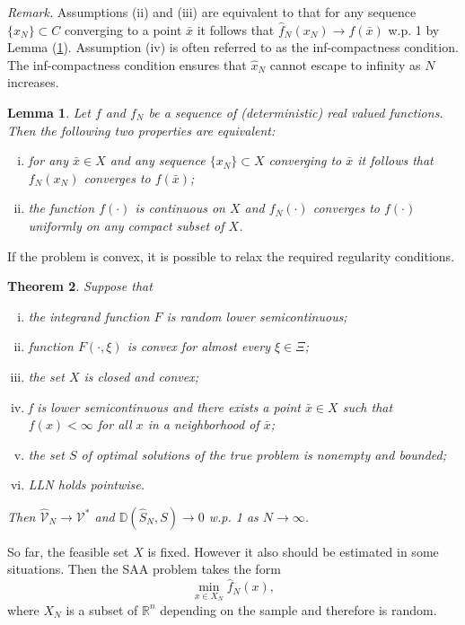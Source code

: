 \documentclass[a4pper,11pt]{article}
\newtheorem{thm}{Theorem}[section]
\newtheorem{lem}[thm]{Lemma}
\begin{document}
\textit{Remark.} Assumptions (ii) and (iii) are equivalent to that for any sequence $\{x_N\}\subset C$ converging to a point $\bar x$ it follows that $\hat f_N(x_N)\to f(\bar x)$ w.p. 1 by Lemma (\ref{5.1}). Assumption (iv) is often referred to as the inf-compactness condition. The inf-compactness condition ensures that $\hat x_N$ cannot escape to infinity as $N$ increases.
\begin{lem}
	Let $f$ and $f_N$ be a sequence of (deterministic) real valued functions. Then the following two properties are equivalent:
	\begin{enumerate}[(i)]
		\item for any $\bar x\in X$ and any sequence $\{x_N\}\subset X$ converging to $\bar x$ it follows that $f_N(x_N)$ converges to $f(\bar x)$;
		\item the function $f(\cdot)$ is continuous on $X$ and $f_N(\cdot)$ converges to $f(\cdot)$ uniformly on any compact subset of $X$.
	\end{enumerate}
	\label{5.1}
\end{lem}
If the problem is convex, it is possible to relax the required regularity conditions.
\begin{thm}
	Suppose that
	\begin{enumerate}[(i)]
		\item the integrand function $F$ is random lower semicontinuous;
		\item function $F(\cdot,\xi)$ is convex for almost every $\xi \in\Xi$;
		\item the set $X$ is closed and convex;
		\item f is lower semicontinuous and there exists a point $\bar x\in X$ such that $f(x)<\infty$ for all $x$ in a neighborhood of $\bar x$;
		\item the set $S$ of optimal solutions of the true problem is nonempty and bounded;
		\item LLN holds pointwise.
	\end{enumerate}
	Then  $\hat {\mathcal V}_N\to \mathcal V^*$ and $\mathbb D(\hat S_N,S)\to 0$ w.p. 1 as $N\to \infty$.
\end{thm}
So far, the feasible set $X$ is fixed. However it also should be estimated in some situations. Then the SAA problem takes the form
$$
	\min_{x\in X_N}\hat f_N(x),
$$
where $X_N$ is a subset of $\mathbb R^n$ depending on the sample and therefore is random.
\end{document}

